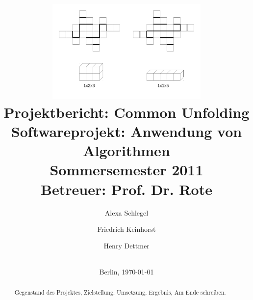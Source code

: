 \documentclass[a4paper,11pt]{scrartcl}
\title{
  \includegraphics[width=0.6\textwidth]{03_pics/commonUnfold_beispiel1.pdf}\\[4ex]
  Projektbericht: Common Unfolding\\[2ex]
  {
  \normalsize Softwareprojekt: Anwendung von Algorithmen\\[4ex]
  }
  {\normalsize Sommersemester 2011}\\
  {\normalsize Betreuer: Prof. Dr. Rote}\\[4ex]
}
\author{Alexa Schlegel\\\mailto{alexa.schlegel@gmail.com} \and Friedrich Keinhorst\\\mailto{fkeinhorst@gmail.com} \and Henry Dettmer\\\mailto{henrydettmer@gmail.com}\\[4ex]
}
\date{Berlin, \today}
\begin{document}
\begin{titlepage}

\maketitle
\thispagestyle{empty}

\vfill{}
\end{titlepage}

\pagestyle{empty}
\clearpage{}

\tableofcontents
\clearpage

\pagestyle{fancy}
\setcounter{page}{1}

\begin{abstract}
Gegenstand des Projektes, Zielstellung, Umsetzung, Ergebnis, Am Ende
schreiben.
\end{abstract}
\clearpage



\clearpage







\nocite{*} 



\clearpage


\listoffigures
{}
\clearpage

\listoftables
{}
\end{document}
